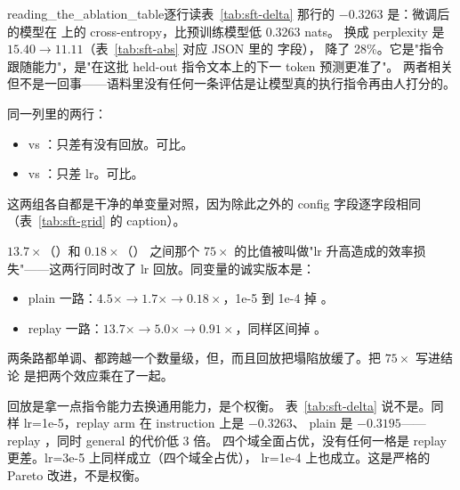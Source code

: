 \begin{examplebox}{reading_the_ablation_table}{逐行读表~\ref{tab:sft-delta}}
  那行的 $-0.3263$ 是：微调后的模型在
 上的 cross-entropy，比预训练模型低 0.3263 nats。
换成 perplexity 是 $15.40 \to 11.11$（表~\ref{tab:sft-abs} 对应 JSON 里的  字段），
降了 28\%。它是"指令跟随能力"，是"在这批 held-out 指令文本上的下一 token 预测更准了"。
两者相关但不是一回事——语料里没有任何一条评估是让模型真的执行指令再由人打分的。

 同一列里的两行：
\begin{itemize}[leftmargin=1.5em, topsep=2pt]
  \item {} vs ：只差有没有回放。可比。
  \item {} vs ：只差 lr。可比。
\end{itemize}
这两组各自都是干净的单变量对照，因为除此之外的 config 字段逐字段相同（表~\ref{tab:sft-grid} 的 caption）。

 $13.7\times$（）和 $0.18\times$（）
之间那个 $75\times$ 的比值被叫做"lr 升高造成的效率损失"——这两行同时改了 lr
回放。同变量的诚实版本是：
\begin{itemize}[leftmargin=1.5em, topsep=2pt]
  \item plain 一路：$4.5\times \to 1.7\times \to 0.18\times$，1e-5 到 1e-4 掉 。
  \item replay 一路：$13.7\times \to 5.0\times \to 0.91\times$，同样区间掉 。
\end{itemize}
两条路都单调、都跨越一个数量级，但，而且回放把塌陷放缓了。把 $75\times$ 写进结论
是把两个效应乘在了一起。
\end{examplebox}

\begin{misconception}{回放是拿一点指令能力去换通用能力，是个权衡。}
表~\ref{tab:sft-delta} 说不是。同样 lr=1e-5，replay arm 在 instruction 上是 $-0.3263$、
plain 是 $-0.3195$——replay ，同时 general 的代价低 3 倍。
四个域全面占优，没有任何一格是 replay 更差。lr=3e-5 上同样成立（四个域全占优），
lr=1e-4 上也成立。这是严格的 Pareto 改进，不是权衡。
\end{misconception}

